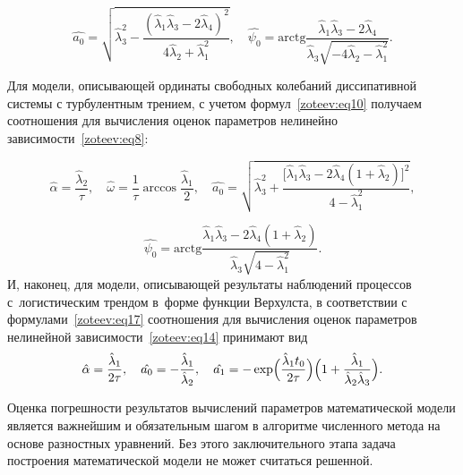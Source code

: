 \begin{equation}
\hat{a_0}=\sqrt{\hat{\lambda}_3^2-\dfrac{(\hat{\lambda}_1\hat{\lambda}_3-2\hat{\lambda}_4)^2}{4\hat{\lambda}_2+\hat{\lambda}_1^2}}, \quad \hat{\psi_0}=\mathrm{arctg}\dfrac{\hat{\lambda}_1\hat{\lambda}_3-2\hat{\lambda}_4}{\hat{\lambda}_3\sqrt{-4\hat{\lambda}_2-\hat{\lambda}_1^2}}.
\label{zoteev:eq42}
\end{equation}

Для модели, описывающей ординаты свободных колебаний диссипативной системы с турбулентным трением, с учетом формул~\eqref{zoteev:eq10} получаем соотношения для вычисления оценок параметров нелинейно зависимости~\eqref{zoteev:eq8}:

\begin{equation*}
\hat{\alpha}=\dfrac{\hat{\lambda}_2}{\tau}, \quad \hat{\omega}=\dfrac{1}{\tau}\arccos\dfrac{\hat{\lambda}_1}{2}, \quad \hat{a_0}=\sqrt{\hat{\lambda}_3^2+\dfrac{\big[\hat{\lambda}_1\hat{\lambda}_3-2\hat{\lambda}_4(1+\hat{\lambda}_2)\big]^2}{4-\hat{\lambda}_1^2}}, 
\label{zoteev:eq43}
\end{equation*}

\begin{equation}
\hat{\psi_0}=\mathrm{arctg}\dfrac{\hat{\lambda}_1\hat{\lambda}_3-2\hat{\lambda}_4(1+\hat{\lambda}_2)}{\hat{\lambda}_3\sqrt{4-\hat{\lambda}_1^2}}.
\label{zoteev:eq43}
\end{equation}
И, наконец, для модели, описывающей результаты наблюдений процессов с~логистическим трендом в~форме функции Верхулста, в соответствии с формулами~\eqref{zoteev:eq17} соотношения для вычисления оценок параметров нелинейной зависимости~\eqref{zoteev:eq14} принимают вид
\begin{equation}
\hat{\alpha}=\dfrac{\hat{\lambda}_1}{2\tau}, \quad \hat{a_0}=-\dfrac{\hat{\lambda}_1}{\hat{\lambda}_2}, \quad \hat{a_1}=-\exp\Bigl(\dfrac{\hat{\lambda}_1 t_0}{2\tau}\Bigr)\Bigl(1+\dfrac{\hat{\lambda}_1}{\hat{\lambda}_2\hat{\lambda}_3}\Bigr).
\label{zoteev:eq44}
\end{equation}

\smallskip

Оценка погрешности результатов вычислений параметров математической модели является важнейшим и обязательным шагом в алгоритме численного метода на основе разностных уравнений. Без этого заключительного этапа задача построения математической модели не может считаться решенной.


